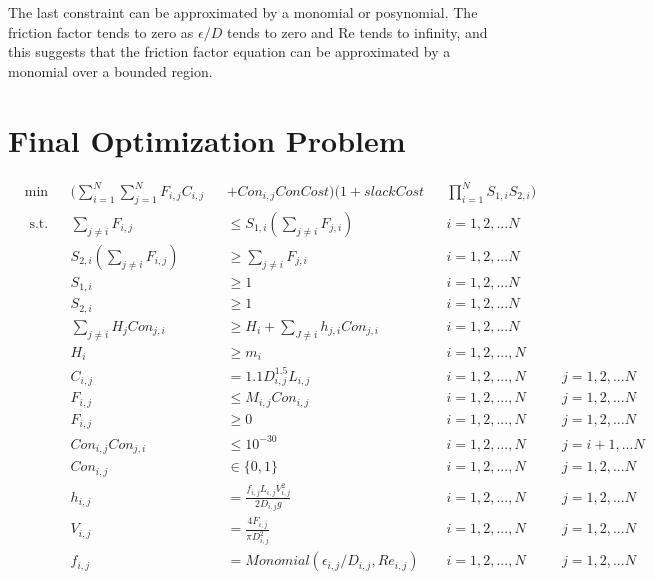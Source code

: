 \documentclass[12pt]{article}
\begin{document}
The last constraint can be approximated by a monomial or posynomial. The friction factor tends to zero as $\epsilon/D$ tends to zero and Re tends to infinity, and this suggests that the friction factor equation can be approximated by a monomial over a bounded region. 

\section{Final Optimization Problem}

\begin{equation}
\begin{aligned}
	&\min &&(\sum_{i=1}^{N}\sum_{j=1}^{N} F_{i,j} C_{i,j} && + Con_{i,j} ConCost)(1 + slackCost &&\prod_{i=1}^{N}S_{1,i}S_{2,i})\\
    & \text{ s.t.} && \sum_{j \neq i} F_{i,j} && \leq S_{1,i}(\sum_{j \neq i} F_{j,i}) \quad && i = 1, 2, ... N\\
	& && S_{2,i}(\sum_{j \neq i} F_{i,j}) && \geq \sum_{j \neq i} F_{j,i} \quad && i = 1, 2, ... N\\
	& && S_{1,i} && \geq 1 \quad && i = 1, 2, ... N\\
	& && S_{2,i} && \geq 1 \quad && i = 1, 2, ... N\\
    & && \sum_{j \neq i} H_j Con_{j,i} && \geq H_i + \sum_{J \neq i} h_{j,i}Con_{j,i} && i = 1,2, ...N\\
    & && H_i && \geq m_i && i = 1, 2, ..., N \\
    & && C_{i,j} && = 1.1 D_{i,j}^{1.5} L_{i,j} && i = 1, 2, ..., N \quad && j = 1, 2, ... N\\
    & && F_{i,j} && \leq M_{i,j} Con_{i,j} && i = 1, 2, ..., N \quad && j = 1, 2, ... N\\
    & && F_{i,j} && \geq 0 && i = 1, 2, ..., N \quad && j = 1, 2, ... N\\
    & && Con_{i,j}Con_{j,i} && \leq 10^{-30} && i = 1, 2, ..., N \quad && j = i+1, ... N\\
    & && Con_{i,j} &&\in \{0,1\} && i = 1, 2, ..., N \quad && j = 1, 2, ... N\\
    & && h_{i,j} && = \frac{f_{i,j} L_{i,j} V_{i,j}^2}{2D_{i,j} g} && i = 1, 2, ..., N \quad && j = 1, 2, ... N\\
    & && V_{i,j} && = \frac{4 F_{i,j}}{\pi D_{i,j}^2} && i = 1, 2, ..., N \quad && j = 1, 2, ... N\\
    & && f_{i,j} &&= Monomial(\epsilon_{i,j}/D_{i,j}, Re_{i,j}) && i = 1, 2, ..., N \quad && j = 1, 2, ... N\\

\end{aligned}
\end{equation}
\end{document}
